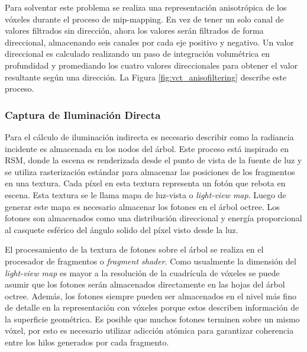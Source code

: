 Para solventar este problema se realiza una representación anisotrópica de los vóxeles durante el proceso de mip-mapping. En vez de tener un solo canal de valores filtrados sin dirección, ahora los valores serán filtrados de forma direccional, almacenando seis canales por cada eje positivo y negativo. Un valor direccional es calculado realizando un paso de integración volumétrica en profundidad y promediando los cuatro valores direccionales para obtener el valor resultante según una dirección. La Figura \ref{fig:vct_anisofiltering} describe este proceso.

\subsubsection{Captura de Iluminación Directa}
\label{subsub:voxel_capture}
Para el cálculo de iluminación indirecta es necesario describir como la radiancia incidente es almacenada en los nodos del árbol. Este proceso está inspirado en \ac{RSM}, donde la escena es renderizada desde el punto de vista de la fuente de luz y se utiliza rasterización estándar para almacenar las posiciones de los fragmentos en una textura. Cada píxel en esta textura representa un fotón que rebota en escena. Esta textura se le llama mapa de luz-vista o \emph{light-view map}. Luego de generar este mapa es necesario almacenar los fotones en el árbol octree. Los fotones son almacenados como una distribución direccional y energía proporcional al casquete esférico del ángulo solido del píxel visto desde la luz.

El procesamiento de la textura de fotones sobre el árbol se realiza en el procesador de fragmentos o \emph{fragment shader}. Como usualmente la dimensión del \emph{light-view map} es mayor a la resolución de la cuadrícula de vóxeles se puede asumir que los fotones serán almacenados directamente en las hojas del árbol octree. Además, los fotones siempre pueden ser almacenados en el nivel más fino de detalle en la representación con vóxeles porque estos describen información de la superficie geométrica. Es posible que muchos fotones terminen sobre un mismo vóxel, por esto es necesario utilizar adicción atómica para garantizar coherencia entre los hilos generados por cada fragmento.
